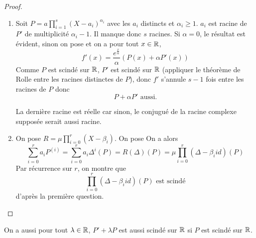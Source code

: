 \documentclass[12pt]{article}
\begin{document}
\begin{proof}
	\phantom{}
	\begin{enumerate}
		\item Soit $P=a\prod_{i=1}^{s}(X-a_{i})^{\alpha_{i}}$ avec les $a_{i}$ distincts et $\alpha_{i}\geqslant1$. $a_{i}$ est racine de $P'$ de multiplicité $\alpha_{i}-1$. Il manque donc $s$ racines. Si $\alpha=0$, le résultat est évident, sinon on pose 
		et on a pour tout $x\in\mathbb{R}$,
		\begin{equation}
			f'(x)=\frac{e^{\frac{x}{\alpha}}}{\alpha}(P(x)+\alpha P'(x))
		\end{equation}
		Comme $P$ est scindé sur $\mathbb{R}$, $P'$ est scindé sur $\mathbb{R}$ (appliquer le théorème de Rolle entre les racines distinctes de $P$), donc $f'$ s'annule $s-1$ fois entre les racines de $P$ donc 
		\begin{equation}
			\boxed{P+\alpha P'\text{ aussi.}}
		\end{equation}

		La dernière racine est réelle car sinon, le conjugué de la racine complexe supposée serait aussi racine.

		\item On pose $R=\mu\prod_{i=0}^{r}(X-\beta_{i})$. On pose 
		On a alors 
		\begin{equation}
			\sum_{i=0}^{r}a_{i}P^{(i)}=\sum_{i=0}^{r}a_{i}\Delta^{i}(P)=R(\Delta)(P)=\mu\prod_{i=0}^{r}(\Delta-\beta_{i}id)(P)
		\end{equation}
		Par récurrence sur $r$, on montre que 
		\begin{equation}
			\boxed{\prod_{i=0}^{r}(\Delta-\beta_{i}id)(P)\text{ est scindé}}
		\end{equation} 
		d'après la première question.
	\end{enumerate}
\end{proof}

\begin{remark}
	On a aussi pour tout $\lambda\in\mathbb{R}$, $P'+\lambda P$ est aussi scindé sur $\mathbb{R}$ si $P$ est scindé sur $\mathbb{R}$.
\end{remark}
\end{document}
